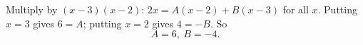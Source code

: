 Multiply by $(x-3)(x-2)$: $2x=A(x-2)+B(x-3)$ for all $x$. Putting $x=3$ gives $6=A$; putting $x=2$ gives $4=-B$. So
\[
\boxed{A=6,\ B=-4}.
\]
